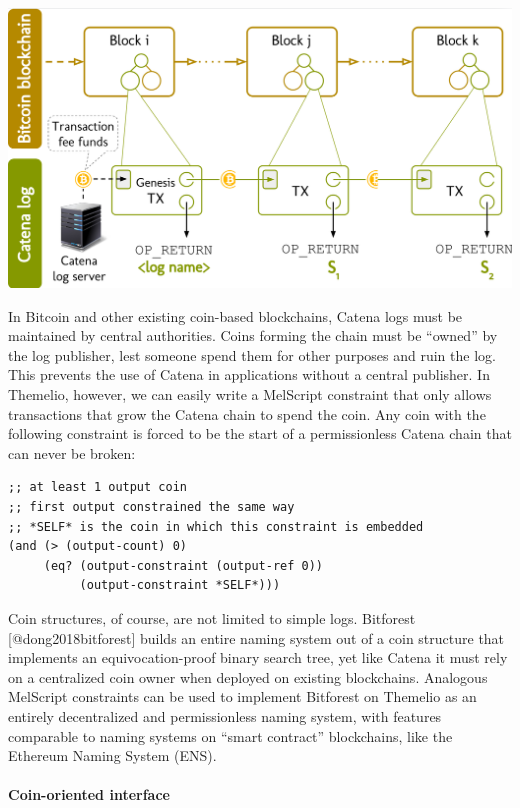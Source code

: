 \documentclass[]{article}
\let\oldparagraph\paragraph
\renewcommand{\paragraph}[1]{\oldparagraph{#1}\mbox{}}
\begin{document}
\includegraphics{../.gitbook/assets/screenshot-from-2020-08-27-17-14-00.png}

In Bitcoin and other existing coin-based blockchains, Catena logs must
be maintained by central authorities. Coins forming the chain must be
``owned'' by the log publisher, lest someone spend them for other
purposes and ruin the log. This prevents the use of Catena in
applications without a central publisher. In Themelio, however, we can
easily write a MelScript constraint that only allows transactions that
grow the Catena chain to spend the coin. Any coin with the following
constraint is forced to be the start of a permissionless Catena chain
that can never be broken:

\begin{verbatim}
;; at least 1 output coin
;; first output constrained the same way
;; *SELF* is the coin in which this constraint is embedded
(and (> (output-count) 0)
     (eq? (output-constraint (output-ref 0))
          (output-constraint *SELF*)))
\end{verbatim}

Coin structures, of course, are not limited to simple logs. Bitforest
{[}@dong2018bitforest{]} builds an entire naming system out of a coin
structure that implements an equivocation-proof binary search tree, yet
like Catena it must rely on a centralized coin owner when deployed on
existing blockchains. Analogous MelScript constraints can be used to
implement Bitforest on Themelio as an entirely decentralized and
permissionless naming system, with features comparable to naming systems
on ``smart contract'' blockchains, like the Ethereum Naming System
(ENS).

\hypertarget{coin-oriented-interface}{%
\paragraph{Coin-oriented interface}\label{coin-oriented-interface}}
\end{document}
